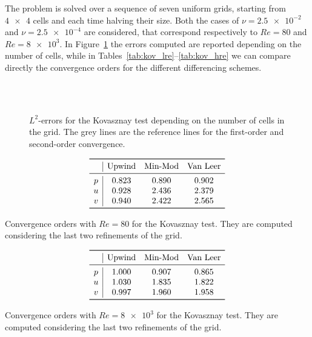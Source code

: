 The problem is solved over a sequence of seven uniform grids, starting from 
$\num{4x4}$ cells and each time halving their size. Both the cases of 
$\nu=\num{2.5e-2}$ and $\nu=\num{2.5e-4}$ are considered, that correspond respectively to 
$Re=80$ and $Re=\num{8e3}$. In Figure~\ref{fig:kov_err} the errors 
computed are reported depending on the number of cells, while in 
Tables~\ref{tab:kov_lre}--\ref{tab:kov_hre} we can compare directly the 
convergence orders for the different differencing schemes.
\begin{figure}
	\centering
	\subfloat[Upwind, $Re = 80$]{
		}
	\subfloat[Upwind, $Re = \num{8e3}$]{
		}\\
	\subfloat[Min-Mod, $Re = 80$]{
		}
	\subfloat[Min-Mod, $Re = \num{8e3}$]{
		}\\
	\subfloat[Van Leer, $Re = 80$]{
		}
	\subfloat[Van Leer, $Re = \num{8e3}$]{
		}
	\caption[$L^2$-errors for the Kovasznay test]{$L^2$-errors for the 
	Kovasznay test depending on the number of cells in the grid. The grey 
	lines are the reference lines for the first-order and second-order 
	convergence.}
	\label{fig:kov_err}
\end{figure}
\begin{table}
	\centering
	\[
	\begin{array}{c|ccc}
	\toprule
	& \text{Upwind} & \text{Min-Mod} & \text{Van Leer} \\ 
	\midrule
	p & 0.823 & 0.890 & 0.902\\
	u & 0.928 & 2.436 & 2.379\\
	v & 0.940 & 2.422 & 2.565\\
	\bottomrule
	\end{array}
	\]
	\caption[Convergence orders with $Re = 80$ for the Kovasznay 
	test]{Convergence orders with $Re = 80$ for the Kovasznay test. They 
	are computed considering the last two refinements of the grid.}
	\label{tab:kov_lre}
	\[
	\begin{array}{c|ccc}
	\toprule
	& \text{Upwind} & \text{Min-Mod} & \text{Van Leer} \\ 
	\midrule
	p & 1.000 & 0.907 & 0.865\\
	u & 1.030 & 1.835 & 1.822\\
	v & 0.997 & 1.960 & 1.958\\
	\bottomrule
	\end{array}
	\]
	\caption[Convergence orders with $Re = \num{8e3}$ for the Kovasznay 
	test]{Convergence orders with $Re = \num{8e3}$ for the Kovasznay 
	test. They are computed considering the last two refinements of the 
	grid.}
	\label{tab:kov_hre}
\end{table}

